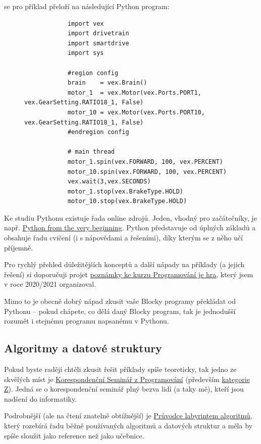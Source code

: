 \documentclass[../main.tex]{subfiles}
\begin{document}
	se pro příklad přeloží na následující Python program:

	\begin{figure}[h!]
		\centering
		\begin{verbatim}
			import vex
			import drivetrain
			import smartdrive
			import sys

			#region config
			brain    = vex.Brain()
			motor_1  = vex.Motor(vex.Ports.PORT1, vex.GearSetting.RATIO18_1, False)
			motor_10 = vex.Motor(vex.Ports.PORT10, vex.GearSetting.RATIO18_1, False)
			#endregion config

			# main thread
			motor_1.spin(vex.FORWARD, 100, vex.PERCENT)
			motor_10.spin(vex.FORWARD, 100, vex.PERCENT)
			vex.wait(3,vex.SECONDS)
			motor_1.stop(vex.BrakeType.HOLD)
			motor_10.stop(vex.BrakeType.HOLD)
		\end{verbatim}
	\end{figure}

	Ke studiu Pythonu existuje řada online zdrojů. Jeden, vhodný pro začátečníky, je např. \href{https://coherentpdf.com/python/pythonfromtheverybeginning.html}{Python from the very beginning}. Python představuje od úplných základů a obsahuje řadu cvičení (i s nápovědami a řešeními), díky kterým se z něho učí příjemně.

	Pro rychlý přehled důležitějších konceptů a další nápady na příklady (a jejich řešení) si doporučuji projet \href{https://slama.dev/programovani-je-hra/}{poznámky ke kurzu Programování je hra}, který jsem v roce 2020/2021 organizoval.

	Mimo to je obecně dobrý nápad zkusit vaše Blocky programy překládat od Pythonu -- pokud chápete, co dělá daný Blocky program, tak je jednodušší rozumět i stejnému programu napsanému v Pythonu.

	\subsection{Algoritmy a datové struktury}
	Pokud byste raději chtěli zkusit řešit příklady spíše teoreticky, tak jedno ze skvělých míst je \href{http://ksp.mff.cuni.cz/}{Korespondenční Seminář z Programování} (především \href{http://ksp.mff.cuni.cz/z/}{kategorie Z}). Jedná se o korespondenční seminář plný bezva lidí (a taky mě), kteří jsou nadšení do informatiky.

	Podrobnější (ale na čtení znatelně obtížnější) je \href{http://pruvodce.ucw.cz/}{Průvodce labyrintem algoritmů}, který rozebírá řadu běžně používaných algoritmů a datových struktur a měla by spíše sloužit jako reference než jako učebnice.
\end{document}
